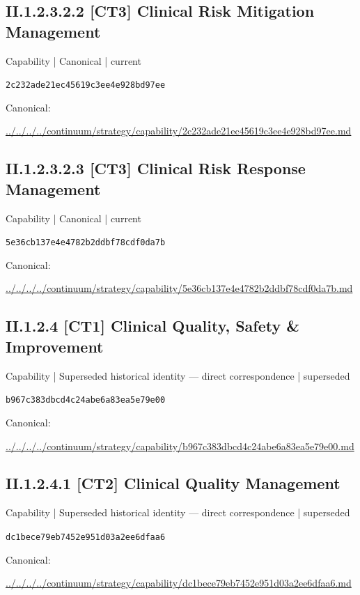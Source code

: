 \documentclass[10pt,a4paper]{article}
\begin{document}
\subsection*{II.1.2.3.2.2 [CT3] Clinical Risk Mitigation Management}
{\small Capability | Canonical | current}\par
\texttt{2c232ade21ec45619c3ee4e928bd97ee}\par
Canonical: \par
{\footnotesize\url{../../../../continuum/strategy/capability/2c232ade21ec45619c3ee4e928bd97ee.md}}\par
\subsection*{II.1.2.3.2.3 [CT3] Clinical Risk Response Management}
{\small Capability | Canonical | current}\par
\texttt{5e36cb137e4e4782b2ddbf78cdf0da7b}\par
Canonical: \par
{\footnotesize\url{../../../../continuum/strategy/capability/5e36cb137e4e4782b2ddbf78cdf0da7b.md}}\par
\subsection*{II.1.2.4 [CT1] Clinical Quality, Safety \& Improvement}
{\small Capability | Superseded historical identity — direct correspondence | superseded}\par
\texttt{b967c383dbcd4c24abe6a83ea5e79e00}\par
Canonical: \par
{\footnotesize\url{../../../../continuum/strategy/capability/b967c383dbcd4c24abe6a83ea5e79e00.md}}\par
\subsection*{II.1.2.4.1 [CT2] Clinical Quality Management}
{\small Capability | Superseded historical identity — direct correspondence | superseded}\par
\texttt{dc1bece79eb7452e951d03a2ee6dfaa6}\par
Canonical: \par
{\footnotesize\url{../../../../continuum/strategy/capability/dc1bece79eb7452e951d03a2ee6dfaa6.md}}\par
\end{document}

